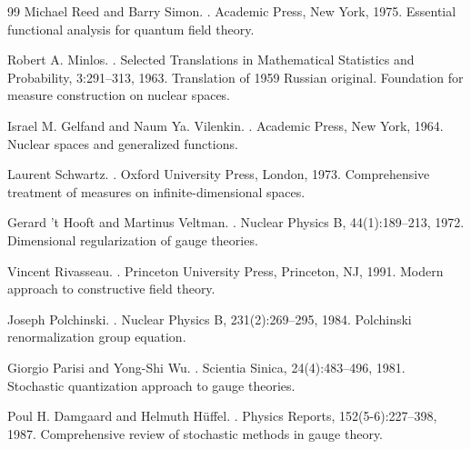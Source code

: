 \documentclass[12pt]{article}
\begin{document}
\begin{thebibliography}{99}
Michael Reed and Barry Simon.
.
\newblock Academic Press, New York, 1975.
\newblock Essential functional analysis for quantum field theory.

Robert A. Minlos.
.
\newblock Selected Translations in Mathematical Statistics and Probability, 3:291--313, 1963.
\newblock Translation of 1959 Russian original. Foundation for measure construction on nuclear spaces.

Israel M. Gelfand and Naum Ya. Vilenkin.
.
\newblock Academic Press, New York, 1964.
\newblock Nuclear spaces and generalized functions.

Laurent Schwartz.
.
\newblock Oxford University Press, London, 1973.
\newblock Comprehensive treatment of measures on infinite-dimensional spaces.

Gerard 't Hooft and Martinus Veltman.
.
\newblock Nuclear Physics B, 44(1):189--213, 1972.
\newblock Dimensional regularization of gauge theories.

Vincent Rivasseau.
.
\newblock Princeton University Press, Princeton, NJ, 1991.
\newblock Modern approach to constructive field theory.

Joseph Polchinski.
.
\newblock Nuclear Physics B, 231(2):269--295, 1984.
\newblock Polchinski renormalization group equation.

Giorgio Parisi and Yong-Shi Wu.
.
\newblock Scientia Sinica, 24(4):483--496, 1981.
\newblock Stochastic quantization approach to gauge theories.

Poul H. Damgaard and Helmuth Hüffel.
.
\newblock Physics Reports, 152(5-6):227--398, 1987.
\newblock Comprehensive review of stochastic methods in gauge theory.


\end{thebibliography}
\end{document}

